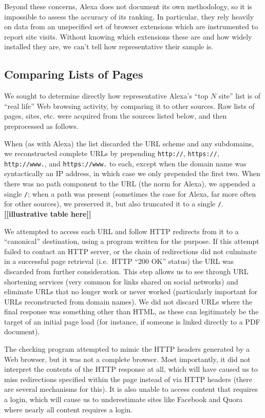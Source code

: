 \documentclass{zarticle}
\def\todo#1{{\color{todocolor}\bfseries [#1]}}
\begin{document}
Beyond these concerns, Alexa does not document its own methodology, so
it is impossible to assess the accuracy of its ranking.  In
particular, they rely heavily on data from an unspecified set of
browser extensions which are instrumented to report site visits.
Without knowing which extensions these are and how widely installed
they are, we can't tell how representative their sample is.

\subsection{Comparing Lists of Pages}

We sought to determine directly how representative Alexa's “top $N$
site” list is of “real life” Web browsing activity, by comparing it to
other sources.  Raw lists of pages, sites, etc. were acquired from the
sources listed below, and then preprocessed as follows.

When (as with Alexa) the list discarded the URL scheme and any
subdomains, we reconstructed complete URLs by prepending
\verb|http://|, \verb|https://|, \verb|http://www.|, and
\verb|https://www.| to each, except when the domain name was
syntactically an IP address, in which case we only prepended the first
two.  When there was no path component to the URL (the norm for
Alexa), we appended a single \verb|/|; when a path was present
(sometimes the case for Alexa, far more often for other sources), we
preserved it, but also truncated it to a single \verb|/|.
\todo{[illustrative table here]}

We attempted to access each URL and follow HTTP redirects from it to a
“canonical” destination, using a program written for the purpose.  If
this attempt failed to contact an HTTP server, or the chain of
redirections did not culminate in a successful page retrieval
(i.e.\ HTTP “200 OK” status) the URL was discarded from further
consideration.  This step allows us to see through URL shortening
services (very common for links shared on social networks) and
eliminate URLs that no longer work or never worked (particularly
important for URLs reconstructed from domain names).  We did not
discard URLs where the final response was something other than HTML,
as these can legitimately be the target of an initial page load (for
instance, if someone is linked directly to a PDF document).

The checking program attempted to mimic the HTTP headers generated by
a Web browser, but it was not a complete browser.  Most importantly,
it did not interpret the contents of the HTTP response at all, which
will have caused us to miss redirections specified within the page
instead of via HTTP headers (there are several mechanisms for this).
It is also unable to access content that requires a login, which will
cause us to underestimate sites like Facebook and Quora where nearly
all content requires a login.
\end{document}
